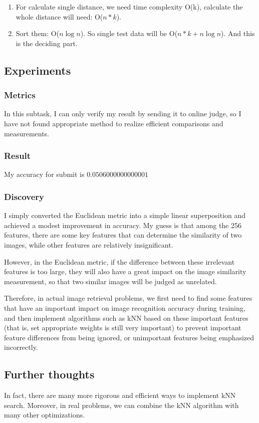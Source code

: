 \documentclass{article}
\begin{document}
\begin{enumerate}
    \item For calculate single distance, we need time complexity O(k), calculate the whole distance will need: O($n*k$).
    \item Sort them: O($n \log n$). So single test data will be O($n*k + n \log n$). And this is the deciding part.
\end{enumerate}

\subsection{Experiments}
\subsubsection{Metrics}
In this subtask, I can only verify my result by sending it to online judge, so I have not found appropriate method to realize efficient comparisons and measurements.
\subsubsection{Result}
My accuracy for submit is $0.0506000000000001$

\subsubsection{Discovery}
I simply converted the Euclidean metric into a simple linear superposition and achieved a modest improvement in accuracy. My guess is that among the 256 features, there are some key features that can determine the similarity of two images, while other features are relatively insignificant.

However, in the Euclidean metric, if the difference between these irrelevant features is too large, they will also have a great impact on the image similarity measurement, so that two similar images will be judged as unrelated. 

Therefore, in actual image retrieval problems, we first need to find some features that have an important impact on image recognition accuracy during training, and then implement algorithms such as kNN based on these important features (that is, set appropriate weights is still very important) to prevent important feature differences from being ignored, or unimportant features being emphasized incorrectly.

\subsection{Further thoughts}
In fact, there are many more rigorous and efficient ways to implement kNN search. Moreover, in real problems, we can combine the kNN algorithm with many other optimizations.
\end{document}
